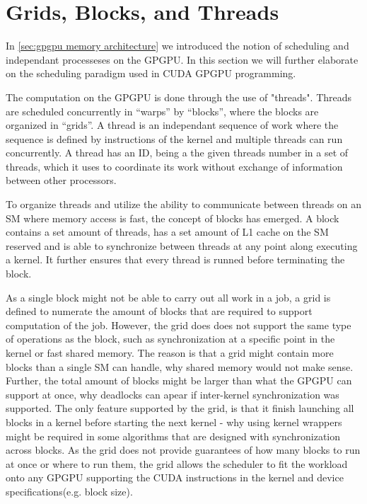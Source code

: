 \section{Grids, Blocks, and Threads}
\label{sec:grids blocks threads}

In \cref{sec:gpgpu memory architecture} we introduced the notion of scheduling and independant processeses on the GPGPU.
In this section we will further elaborate on the scheduling paradigm used in CUDA GPGPU programming.

The computation on the GPGPU is done through the use of "threads".
Threads are scheduled concurrently in ``warps'' by ``blocks'', where the blocks are organized in ``grids''.
A thread is an independant sequence of work where the sequence is defined by instructions of the kernel and multiple threads can run concurrently.
A thread has an ID, being a the given threads number in a set of threads, which it uses to coordinate its work without exchange of information between other processors.

To organize threads and utilize the ability to communicate between threads on an SM where memory access is fast, the concept of blocks has emerged.
A block contains a set amount of threads, has a set amount of L1 cache on the SM reserved and is able to synchronize between threads at any point along executing a kernel.
It further ensures that every thread is runned before terminating the block.

As a single block might not be able to carry out all work in a job, a grid is defined to numerate the amount of blocks that are required to support computation of the job.
However, the grid does does not support the same type of operations as the block, such as synchronization at a specific point in the kernel or fast shared memory.
The reason is that a grid might contain more blocks than a single SM can handle, why shared memory would not make sense.
Further, the total amount of blocks might be larger than what the GPGPU can support at once, why deadlocks can apear if inter-kernel synchronization was supported.
The only feature supported by the grid, is that it finish launching all blocks in a kernel before starting the next kernel - why using kernel wrappers might be required in some algorithms that are designed with synchronization across blocks.
As the grid does not provide guarantees of how many blocks to run at once or where to run them, the grid allows the scheduler to fit the workload onto any GPGPU supporting the CUDA instructions in the kernel and device specifications(e.g. block size).

